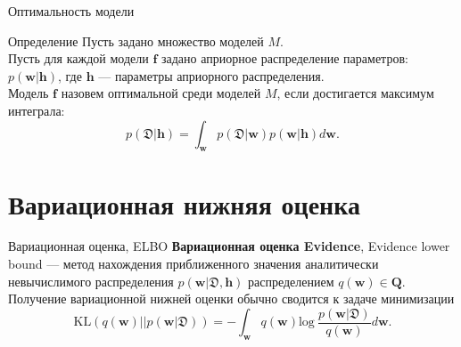 \documentclass[usenames,dvipsnames,10pt,pdf,utf8,russian,aspectratio=43]{beamer}
\begin{document}
\begin{frame}{Оптимальность модели}
\begin{block}{Определение}
Пусть задано множество моделей $M$.  \\
Пусть для каждой модели $\mathbf{f}$ задано априорное распределение параметров: $p(\mathbf{w}|\mathbf{h})$, где $\mathbf{h}$ --- параметры априорного распределения.\\
Модель $\mathbf{f}$ назовем оптимальной среди моделей ${M}$, если достигается максимум интеграла:
\[
	p(\mathfrak{D}|\mathbf{h}) = \int_\mathbf{w} p(\mathfrak{D}|\mathbf{w})p(\mathbf{w}|\mathbf{h}) d\mathbf{w}.
\]
\end{block}
\end{frame}




\section{Вариационная нижняя оценка}
\begin{frame}{Вариационная оценка, ELBO}
\textbf{Вариационная оценка Evidence}, Evidence lower bound --- метод нахождения приближенного значения аналитически невычислимого распределения $p(\mathbf{w}|\mathfrak{D}, \mathbf{h})$ распределением $q(\mathbf{w}) \in \mathbf{Q}$. Получение вариационной нижней оценки обычно сводится к задаче минимизации
$$\text{KL}(q(\mathbf{w})||p(\mathbf{w}| \mathfrak{D}))=
-\int_{\mathbf{w}} q(\mathbf{w}) \text{log}~\frac{p(\mathbf{w}| \mathfrak{D})} {q(\mathbf{w})}d\mathbf{w}.
$$

\begin{figure}
  \centering
\label{fig:1}\qquad

\end{figure}

\end{frame}
\end{document}
